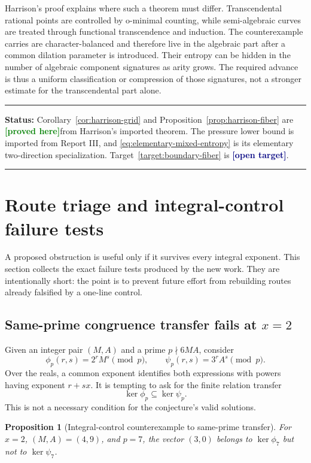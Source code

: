 \documentclass[11pt,oneside]{article}
\newtheorem{proposition}[theorem]{Proposition}
\theoremstyle{definition}
\theoremstyle{remark}
\newcommand{\statusproved}{\textcolor{green}{\textbf{[proved here]}}}
\newcommand{\statustarget}{\textcolor{navy}{\textbf{[open target]}}}
\newenvironment{statusbox}[1]
{\begin{center}\begin{minipage}{0.95\textwidth}\raggedright\hrule
\vspace{0.45em}\textbf{Status:} #1\par\vspace{0.35em}}
{\vspace{0.35em}\hrule\end{minipage}\end{center}}
\begin{document}
Harrison's proof explains where such a theorem must differ.  Transcendental rational points are
controlled by o-minimal counting, while semi-algebraic curves are treated through functional
transcendence and induction.  The counterexample carries are character-balanced and therefore
live in the algebraic part after a common dilation parameter is introduced.  Their entropy can be
hidden in the number of algebraic component signatures as arity grows.  The required advance is
thus a uniform classification or compression of those signatures, not a stronger estimate for
the transcendental part alone.

\begin{statusbox}{Corollary~\ref{cor:harrison-grid} and
Proposition~\ref{prop:harrison-fiber} are \statusproved from Harrison's imported theorem.
The pressure lower bound is imported from Report III, and
\eqref{eq:elementary-mixed-entropy} is its elementary two-direction specialization.
Target~\ref{target:boundary-fiber} is \statustarget.}
\end{statusbox}

\section{Route triage and integral-control failure tests}
\label{sec:audits}

A proposed obstruction is useful only if it survives every integral exponent.  This section
collects the exact failure tests produced by the new work.  They are intentionally short: the
point is to prevent future effort from rebuilding routes already falsified by a one-line control.

\subsection{Same-prime congruence transfer fails at \texorpdfstring{$x=2$}{x=2}}

Given an integer pair $(M,A)$ and a prime $p\nmid6MA$, consider
\[
  \phi_p(r,s)=2^rM^s\pmod p,
  \qquad
  \psi_p(r,s)=3^rA^s\pmod p.
\]
Over the reals, a common exponent identifies both expressions with powers having exponent
$r+sx$.  It is tempting to ask for the finite relation transfer
\begin{equation}
  \ker\phi_p\subseteq\ker\psi_p.
  \label{eq:same-prime-kernel-inclusion}
\end{equation}
This is not a necessary condition for the conjecture's valid solutions.

\begin{proposition}[Integral-control counterexample to same-prime transfer]
\label{prop:mod7-control}
For $x=2$, $(M,A)=(4,9)$, and $p=7$, the vector $(3,0)$ belongs to
$\ker\phi_7$ but not to $\ker\psi_7$.
\end{proposition}
\end{document}
